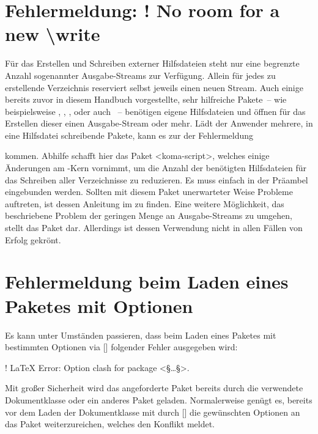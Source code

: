 \section{Fehlermeldung: ! No room for a new \textbackslash write}
%
Für das Erstellen und Schreiben externer Hilfsdateien steht  nur 
eine begrenzte Anzahl sogenannter Ausgabe-Streams zur Verfügung. Allein für 
jedes zu erstellende Verzeichnis reserviert  selbst jeweils einen 
neuen Stream. Auch einige bereits zuvor in diesem Handbuch vorgestellte, sehr 
hilfreiche Pakete~-- wie beispielsweise , , 
,  oder auch ~-- 
benötigen eigene Hilfsdateien und öffnen für das Erstellen dieser einen 
Ausgabe-Stream oder mehr. Lädt der Anwender mehrere, in eine Hilfsdatei 
schreibende Pakete, kann es zur der Fehlermeldung
%
\begin{quoting}
\end{quoting}
%
kommen. Abhilfe schafft hier das Paket <koma-script>, welches 
einige Änderungen am -Kern vornimmt, um die Anzahl der benötigten 
Hilfsdateien für das Schreiben aller Verzeichnisse zu reduzieren. Es muss 
einfach in der Präambel eingebunden werden. Sollten mit diesem Paket 
unerwarteter Weise Probleme auftreten, ist dessen Anleitung im \scrguide zu 
finden. Eine weitere Möglichkeit, das beschriebene Problem der geringen Menge 
an Ausgabe-Streams zu umgehen, stellt das Paket  dar. 
Allerdings ist dessen Verwendung nicht in allen Fällen von Erfolg gekrönt.



\section{Fehlermeldung beim Laden eines Paketes mit Optionen}
%
Es kann unter Umständen passieren, dass beim Laden eines Paketes mit bestimmten 
Optionen via [] 
folgender Fehler ausgegeben wird:
%
\begin{quoting}
\begin{Code}[escapechar=§]
! LaTeX Error: Option clash for package <§\dots§>.
\end{Code}
\end{quoting}
%
Mit großer Sicherheit wird das angeforderte Paket bereits durch die verwendete 
Dokumentklasse oder ein anderes Paket geladen. Normalerweise genügt es, bereits 
vor dem Laden der Dokumentklasse mit  durch 
[] die 
gewünschten Optionen an das Paket weiterzureichen, welches den Konflikt meldet.



